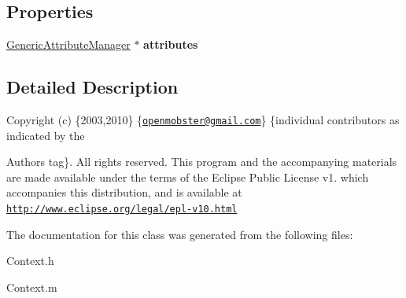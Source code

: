 \subsection*{\-Properties}
\begin{DoxyCompactItemize}
\item 
\hypertarget{interface_context_ac4eab80500f59a05e42abea7b64d41af}{
\hyperlink{interface_generic_attribute_manager}{\-Generic\-Attribute\-Manager} $\ast$ {\bfseries attributes}}
\label{interface_context_ac4eab80500f59a05e42abea7b64d41af}

\end{DoxyCompactItemize}


\subsection{\-Detailed \-Description}
\-Copyright (c) \{2003,2010\} \{\href{mailto:openmobster@gmail.com}{\tt openmobster@gmail.\-com}\} \{individual contributors as indicated by the \begin{DoxyAuthor}{\-Authors}
tag\}. \-All rights reserved. \-This program and the accompanying materials are made available under the terms of the \-Eclipse \-Public \-License v1. which accompanies this distribution, and is available at \href{http://www.eclipse.org/legal/epl-v10.html}{\tt http\-://www.\-eclipse.\-org/legal/epl-\/v10.\-html} 
\end{DoxyAuthor}


\-The documentation for this class was generated from the following files\-:\begin{DoxyCompactItemize}
\item 
\-Context.\-h\item 
\-Context.\-m\end{DoxyCompactItemize}

